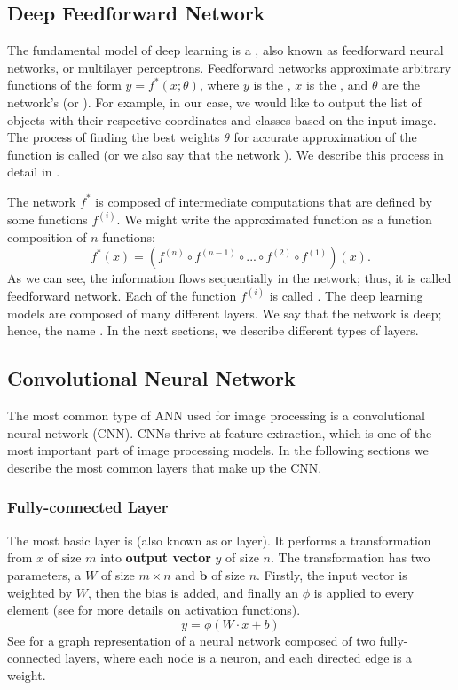 \subsection{Deep Feedforward Network}
The fundamental model of deep learning is a , also
known as feedforward neural networks, or multilayer perceptrons. Feedforward
networks approximate arbitrary functions of the form $y = f^*(x;\theta)$, where
$y$ is the , $x$ is the , and $\theta$ are the network's
 (or ). For example, in our case, we would like to
output the list of objects with their respective coordinates and classes based
on the input image. The process of finding the best weights $\theta$ for
accurate approximation of the function is called  (or we also say 
that the network ). We describe this process in detail in
.

The network $f^*$ is composed of intermediate computations that are defined by
some functions $f^{(i)}$. We might write the approximated function as a function
composition of $n$ functions:
$$
    f^*(x) = (f^{(n)} \circ f^{(n-1)} \circ ... \circ f^{(2)} \circ f^{(1)})(x).
$$
As we can see, the information flows sequentially in the network; thus, it is
called feedforward network. Each of the function $f^{(i)}$ is called .
The deep learning models are composed of many different layers. We say that the
network is deep; hence, the name . In the next sections, we
describe different types of layers.

\subsection{Convolutional Neural Network}
The most common type of ANN used for image processing is a convolutional neural
network (CNN). CNNs thrive at feature extraction, which is one of the most
important part of image processing models. In the following sections we describe
the most common layers that make up the CNN.

\subsubsection{Fully-connected Layer}
The most basic layer is  (also known as
 or  layer). It performs a transformation from
 $x$ of size $m$ into \textbf{output vector}
$y$ of size $n$. The transformation has two parameters, a
 $W$ of size $m \times n$ and 
$\boldsymbol{b}$ of size $n$. Firstly, the input vector is weighted by $W$, then
the bias is added, and finally an  $\phi$
is applied to every element (see  for more details on
activation functions).
$$
    y = \phi(W\cdot x + b)
$$
See  for a graph representation of a neural network composed
of two fully-connected layers, where each node is a neuron, and each directed
edge is a weight.

